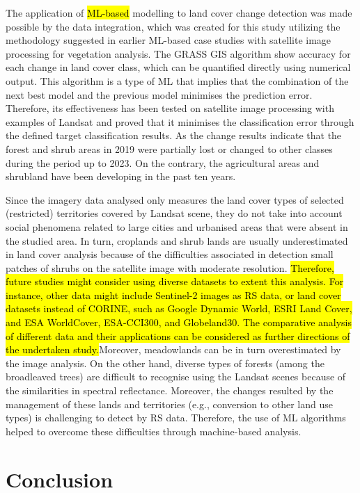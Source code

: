 \documentclass[jimaging,article,submit,pdftex,moreauthors]{Definitions/mdpi}
\begin{document}
The application of \hl{ML-based} modelling to land cover change detection was made possible by the data integration, which was created for this study utilizing the methodology suggested in earlier ML-based case studies with satellite image processing for vegetation analysis. The GRASS GIS algorithm show accuracy for each change in land cover class, which can be quantified directly using numerical output. This algorithm is a type of ML that implies that the combination of the next best model and the previous model minimises the prediction error. Therefore, its effectiveness has been tested on satellite image processing with examples of Landsat and proved that it minimises the classification error through the defined target classification results. As the change results indicate that the forest and shrub areas in 2019 were partially lost or changed to other classes during the period up to 2023. On the contrary, the agricultural areas and shrubland have been developing in the past ten years.

Since the imagery data analysed only measures the land cover types of selected (restricted) territories covered by Landsat scene, they do not take into account social phenomena related to large cities and urbanised areas that were absent in the studied area. In turn, croplands and shrub lands are usually underestimated in land cover analysis because of the difficulties associated in detection small patches of shrubs on the satellite image with moderate resolution. \hl{Therefore, future studies might consider using diverse datasets to extent this analysis. For instance, other data might include Sentinel-2 images as RS data, or land cover datasets instead of CORINE, such as Google Dynamic World, ESRI Land Cover, and ESA WorldCover, ESA-CCI300, and Globeland30. The comparative analysis of different data and their applications can be considered as further directions of the undertaken study.}Moreover, meadowlands can be in turn overestimated by the image analysis. On the other hand, diverse types of forests (among the broadleaved trees) are difficult to recognise using the Landsat scenes because of the similarities in spectral reflectance. Moreover, the changes resulted by the management of these lands and territories (e.g., conversion to other land use types) is challenging to detect by RS data. Therefore, the use of ML algorithms helped to overcome these difficulties through machine-based analysis.

\section{Conclusion}
\label{sec5}
\end{document}
